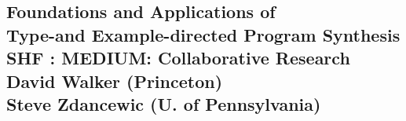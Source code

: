 \documentclass[11pt]{article}
\newcommand{\mytitle}{Foundations and Applications of \\
Type-and Example-directed Program Synthesis}
\begin{document}

%

\newpage
{}
\setcounter{page}{1}

\begin{centering}
\section*{{\LARGE  \mytitle}  \\ 
   {\normalsize SHF : MEDIUM: Collaborative Research} \\
   {\normalsize David Walker (Princeton)} \\ 
   {\normalsize Steve Zdancewic (U. of Pennsylvania)} }
\end{centering}

\makeatletter
\renewcommand{\paragraph}{%
  \@startsection{paragraph}{4}%
  {\z@}{0.5ex \@plus 0.5ex \@minus .2ex}{-1em}%
  {\normalfont\normalsize\bfseries}%
}
\makeatother



%

\newpage

\setcounter{page}{1}



\newpage
\end{document}
